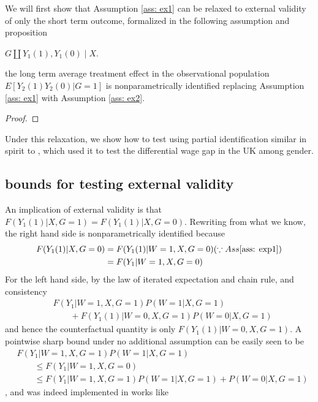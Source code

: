 \documentclass{article}
\begin{document}
We will first show that Assumption \ref{ass: ex1} can be relaxed to external validity of only the short term outcome, formalized in the following assumption and proposition
\begin{assumption}\label{ass: ex2}
    $G \amalg Y_1(1) ,Y_1(0) \mid X$.
\end{assumption}
\begin{proposition}
    the long term average treatment effect in the observational population $ E[Y_2(1) Y_2(0) | G=1]$ is nonparametrically identified replacing Assumption \ref{ass: ex1} with Assumption \ref{ass: ex2}.
\end{proposition}
\begin{proof}
    
\end{proof}

Under this relaxation, we show how to test using partial identification similar in spirit to \cite{blundell2007changes}, which used it to test the differential wage gap in the UK among gender.
\subsection{  bounds for testing external validity}
\label{sec:uniform bound 1}
An implication of external validity is that $ F(Y_1(1) | X, G=1) = F(Y_1(1) | X, G=0) $. Rewriting from what we know, the right hand side is nonparametrically identified because  
\begin{align}
    F(Y_1(1) | X, G=0) &= F(Y_1(1) | W=1, X, G=0 ) (\because Ass \ref{ass: exp1} )\\
    &= F(Y_1| W=1, X, G=0)
\end{align}
For the left hand side, by the law of iterated expectation and chain rule, and consistency
\begin{align}
    &F(Y_1 | W=1,X,G=1) P(W=1 | X, G=1) \\
    &\hspace{2em}+ F(Y_1(1) | W=0 , X, G=1)  P(W=0 | X, G=1)
\end{align}%
and hence the counterfactual quantity is only $F(Y_1(1) | W=0, X, G=1) $.
A pointwise sharp bound under no additional assumption can be easily seen to be 
\begin{align}
    &F(Y_1 | W=1,X,G=1) P(W=1| X, G=1) \\
    &\hspace{2em}\leq F(Y_1| W=1, X, G=0) \\ 
    &\hspace{2em}\leq F(Y_1 | W=1,X,G=1) P(W=1 | X, G=1) + P(W=0 | X, G=1)
\end{align}
, and was indeed implemented in works like \cite{blundell2007changes}\cite{manski2009identification}
\end{document}
